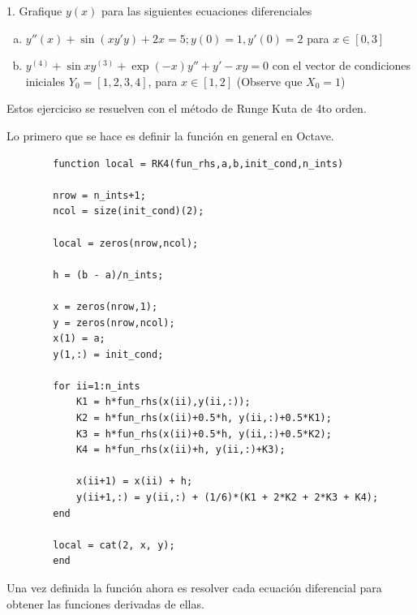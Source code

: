 \documentclass[a4paper, 12pt]{article}
\begin{document}
    1. Grafique $y(x)$ para las siguientes ecuaciones diferenciales

    \begin{enumerate}[a)]
        \item $y''(x) + \sin (xy'y)+2x = 5; y(0) = 1, y'(0) = 2$ para $x \in [0,3]$
        \item $y^{(4)}+\sin xy^{(3)} + \exp (-x) y'' + y' - xy = 0$ con el vector de condiciones iniciales $Y_0 = [1,2,3,4]$, para $x \in [1,2]$ (Observe que $X_0 = 1$)
    \end{enumerate}

    Estos ejerciciso se resuelven con el método de Runge Kuta de 4to orden.

    Lo primero que se hace es definir la función en general en Octave.

    \begin{verbatim}
        function local = RK4(fun_rhs,a,b,init_cond,n_ints)
  
        nrow = n_ints+1;
        ncol = size(init_cond)(2);
        
        local = zeros(nrow,ncol);
        
        h = (b - a)/n_ints;
        
        x = zeros(nrow,1);
        y = zeros(nrow,ncol);
        x(1) = a;
        y(1,:) = init_cond;
        
        for ii=1:n_ints
            K1 = h*fun_rhs(x(ii),y(ii,:));
            K2 = h*fun_rhs(x(ii)+0.5*h, y(ii,:)+0.5*K1);
            K3 = h*fun_rhs(x(ii)+0.5*h, y(ii,:)+0.5*K2);
            K4 = h*fun_rhs(x(ii)+h, y(ii,:)+K3);
            
            x(ii+1) = x(ii) + h;
            y(ii+1,:) = y(ii,:) + (1/6)*(K1 + 2*K2 + 2*K3 + K4);
        end
        
        local = cat(2, x, y);
        end
    \end{verbatim}

    Una vez definida la función ahora es resolver cada ecuación diferencial para obtener las funciones derivadas de ellas.
\end{document}
